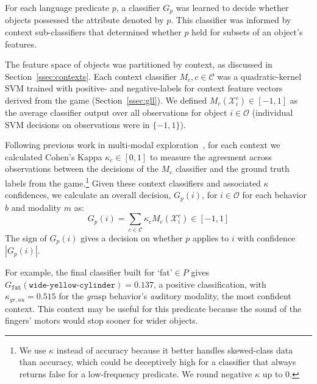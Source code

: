 For each language predicate $p$, a classifier $G_p$ was learned to decide whether objects possessed the attribute denoted by $p$.
This classifier was informed by context sub-classifiers that determined whether $p$ held for subsets of an object's features.

The feature space of objects was partitioned by context, as discussed in Section~\ref{ssec:contexts}.
Each context classifier $M_{c}, c\in\mathcal{C}$ was a quadratic-kernel SVM trained with positive- and negative-labels for context feature vectors derived from the \ispy game (Section~\ref{ssec:gll}).
We defined $M_{c}(\mathcal{X}_i^c)\in [-1,1]$ as the average classifier output over all observations for object $i\in\mathcal{O}$ (individual SVM decisions on observations were in $\{-1,1\}$).

Following previous work in multi-modal exploration~\cite{sinapov:icra14}, for each context we calculated Cohen's Kappa $\kappa_{c}\in[0,1]$ to measure the agreement across observations between the decisions of the $M_{c}$ classifier and the ground truth labels from the \ispy game.\footnote{We use $\kappa$ instead of accuracy because it better handles skewed-class data than accuracy, which could be deceptively high for a classifier that always returns false for a low-frequency predicate. We round negative $\kappa$ up to $0$.}
Given these context classifiers and associated $\kappa$ confidences, we calculate an overall decision, $G_p(i)$, for $i\in\mathcal{O}$ for each behavior $b$ and modality $m$ as:
\begin{equation}
	G_p(i) = \sum_{c\in\mathcal{C}}{\kappa_{c} M_{c}(\mathcal{X}_i^c)} \in [-1,1]
\end{equation}
The sign of $G_p(i)$ gives a decision on whether $p$ applies to $i$ with confidence $|G_p(i)|$.

For example, the final classifier built for `fat'$\in P$ gives $G_{\texttt{fat}}(\texttt{wide-yellow-cylinder}) = 0.137$, a positive classification, with $\kappa_{gr,au}=0.515$ for the \textit{gr}asp behavior's \textit{au}ditory modality, the most confident context. This context may be useful for this predicate because the sound of the fingers' motors would stop sooner for wider objects.
